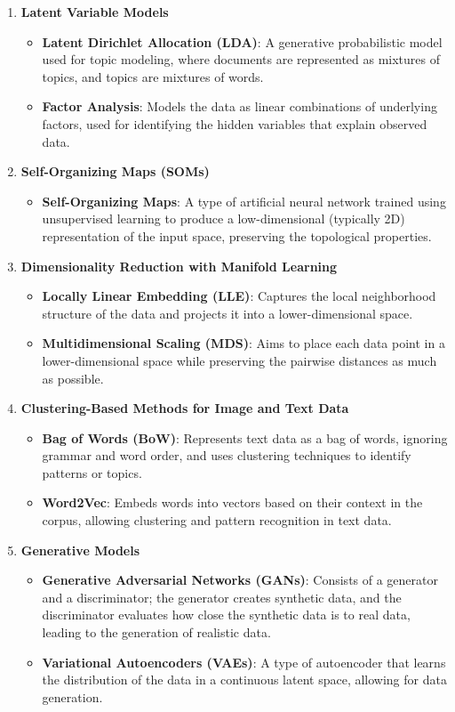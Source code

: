 \begin{enumerate}
    \item \textbf{Latent Variable Models}
    \begin{itemize}
        \item \textbf{Latent Dirichlet Allocation (LDA)}: A generative probabilistic model used for topic modeling, where documents are represented as mixtures of topics, and topics are mixtures of words.
        \item \textbf{Factor Analysis}: Models the data as linear combinations of underlying factors, used for identifying the hidden variables that explain observed data.
    \end{itemize}

    \item \textbf{Self-Organizing Maps (SOMs)}
    \begin{itemize}
        \item \textbf{Self-Organizing Maps}: A type of artificial neural network trained using unsupervised learning to produce a low-dimensional (typically 2D) representation of the input space, preserving the topological properties.
    \end{itemize}

    \item \textbf{Dimensionality Reduction with Manifold Learning}
    \begin{itemize}
        \item \textbf{Locally Linear Embedding (LLE)}: Captures the local neighborhood structure of the data and projects it into a lower-dimensional space.
        \item \textbf{Multidimensional Scaling (MDS)}: Aims to place each data point in a lower-dimensional space while preserving the pairwise distances as much as possible.
    \end{itemize}

    \item \textbf{Clustering-Based Methods for Image and Text Data}
    \begin{itemize}
        \item \textbf{Bag of Words (BoW)}: Represents text data as a bag of words, ignoring grammar and word order, and uses clustering techniques to identify patterns or topics.
        \item \textbf{Word2Vec}: Embeds words into vectors based on their context in the corpus, allowing clustering and pattern recognition in text data.
    \end{itemize}

    \item \textbf{Generative Models}
    \begin{itemize}
        \item \textbf{Generative Adversarial Networks (GANs)}: Consists of a generator and a discriminator; the generator creates synthetic data, and the discriminator evaluates how close the synthetic data is to real data, leading to the generation of realistic data.
        \item \textbf{Variational Autoencoders (VAEs)}: A type of autoencoder that learns the distribution of the data in a continuous latent space, allowing for data generation.
    \end{itemize}


\end{enumerate}
